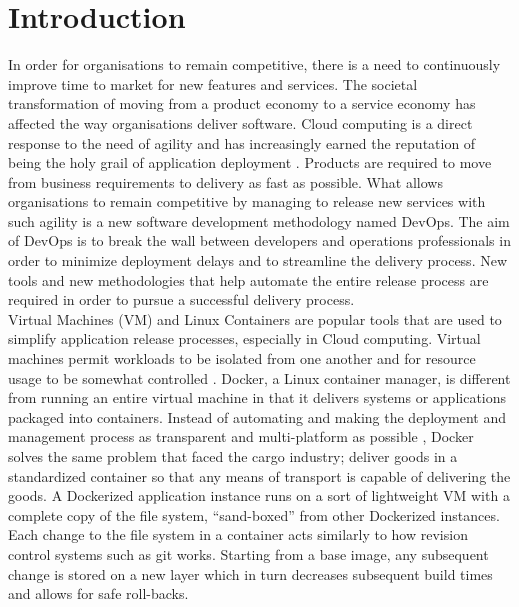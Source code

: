 \iffalse  \fi
\chapter{Introduction}
In order for organisations to remain competitive, there is a need to continuously improve time to market for new features and services. The societal transformation of moving from a product economy to a service economy has affected the way organisations deliver software. Cloud computing is a direct response to the need of agility and has increasingly earned the reputation of being the holy grail of application deployment \cite{7034713}. Products are required to move from business requirements to delivery as fast as possible. What allows organisations to remain competitive by managing to release new services with such agility is a new software development methodology named DevOps. The aim of DevOps is to break the wall between developers and operations professionals in order to minimize deployment delays and to streamline the delivery process. New tools and new methodologies that help automate the entire release process are required in order to pursue a successful delivery process.\\

Virtual Machines (VM) and Linux Containers are popular tools that are used to simplify application release processes, especially in Cloud computing. Virtual machines permit workloads to be isolated from one another and for resource usage to be somewhat controlled \cite{7095802}. Docker, a Linux container manager, is different from running an entire virtual machine in that it delivers systems or applications packaged into containers. Instead of automating and making the deployment and management process as transparent and multi-platform as possible \cite{7095802}, Docker solves the same problem that faced the cargo industry; deliver goods in a standardized container so that any means of transport is capable of delivering the goods. A Dockerized application instance runs on a sort of lightweight VM with a complete copy of the file system, “sand-boxed” from other Dockerized instances. Each change to the file system in a container acts similarly to how revision control systems such as git works. Starting from a base image, any subsequent change is stored on a new layer which in turn decreases subsequent build times and allows for safe roll-backs.\\

